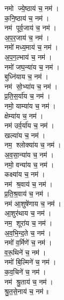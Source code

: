 \begin{multicols}{2}
\begin{flushleft}
नमो ज्ये॒ष्ठाय॑ च॒ नम॑।\\
क॒नि॒ष्ठाय॑ च॒ नम॑।\\
नम॑ पूर्व॒जाय॑ च॒ नम॑।\\
अ॒प॒र॒जाय॑ च॒ नम॑।\\
नमो॑ मध्य॒माय॑ च॒ नम॑।\\
अ॒प॒ग॒ल्भाय॑ च॒ नम॑।\\
नमो॑ जघ॒न्या॑य च॒ नम॑।\\
बुध्नि॑याय च॒ नम॑।\\
नम॑ सो॒भ्या॑य च॒ नम॑।\\
प्र॒ति॒स॒र्या॑य च॒ नम॑।\hfill {}\\
नमो॒ याम्या॑य च॒ नम॑।\\
क्षेम्या॑य च॒ नम॑।\\
नम॑ उर्व॒र्या॑य च॒ नम॑।\\
खल्या॑य च॒ नम॑।\\
नम॒ श्लोक्या॑य च॒ नम॑।\\
अ॒व॒सा॒न्या॑य च॒ नम॑।\\
नमो॒ वन्या॑य च॒ नम॑।\\
कक्ष्या॑य च॒ नम॑।\\
नम॑ श्र॒वाय॑ च॒ नम॑।\\
प्र॒ति॒श्र॒वाय॑ च॒ नम॑।\hfill {}\\
नम॑ आ॒शुषे॑णाय च॒ नम॑।\\
आ॒शुर॑थाय च॒ नम॑।\\
नम॒ शूरा॑य च॒ नम॑।\\
अ॒व॒भि॒न्द॒ते च॒ नम॑।\\
नमो॑ व॒र्मिणे॑ च॒ नम॑।\\
व॒रू॒थिने॑ च॒ नम॑।\\
नमो॑ बि॒ल्मिने॑ च॒ नम॑।\\
क॒व॒चिने॑ च॒ नम॑।\\
नम॑ श्रु॒ताय॑ च॒ नम॑।\\
श्रु॒त॒से॒नाय॑ च॒ नम॑॥\hfill {}\\


\end{flushleft}
\end{multicols}
